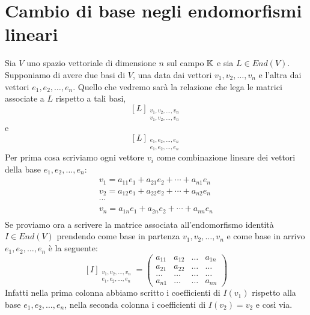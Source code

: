 \section{Cambio di base negli endomorfismi lineari}
Sia $V$ uno spazio vettoriale di dimensione $n$ sul campo $\mathbb{K}$
e sia $L \in End(V)$. Supponiamo di avere due basi di $V$, una data dai vettori
$v_1, v_2, \dots, v_n$ e l'altra dai vettori $e_1, e_2, \dots, e_n$. Quello che
vedremo sarà la relazione che lega le matrici associate a $L$ rispetto a tali
basi,
\[
	[L]_{\substack{
				v_1, v_2, \dots, v_n \\
				v_1, v_2, \dots, v_n
			}}
\]
e
\[
	[L]_{\substack{
				e_1, e_2, \dots, e_n \\
				e_1, e_2, \dots, e_n
			}}
\]
Per prima cosa scriviamo ogni vettore $v_i$ come combinazione lineare dei vettori
della base $e_1, e_2, \dots, e_n$:
\begin{gather*}
	v_1 = a_{11}e_1 + a_{21}e_2 + \cdots + a_{n1}e_n \\
	v_2 = a_{12}e_1 + a_{22}e_2 + \cdots + a_{n2}e_n \\
	\cdots                                           \\
	v_n = a_{1n}e_1 + a_{2n}e_2 + \cdots + a_{nn}e_n \\
\end{gather*}
Se proviamo ora a scrivere la matrice associata all'endomorfismo identità
$I \in End(V)$ prendendo come base in partenza $v_1, v_2, \dots, v_n$ e come base
in arrivo $e_1, e_2, \dots, e_n$ è la seguente:
\[
	[I]_{\substack{
				v_1, v_2, \dots, v_n \\
				e_1, e_2, \dots, e_n
			}} = \begin{pmatrix}
		a_{11} & a_{12} & \dots & a_{1n} \\
		a_{21} & a_{22} & \dots & \dots  \\
		\dots  & \dots  & \dots & \dots  \\
		a_{n1} & \dots  & \dots & a_{nn}
	\end{pmatrix}
\]
Infatti nella prima colonna abbiamo scritto i coefficienti di $I(v_1)$ rispetto
alla base $e_1, e_2, \dots, e_n$, nella seconda colonna i coefficienti di
$I(v_2) = v_2$ e così via.


